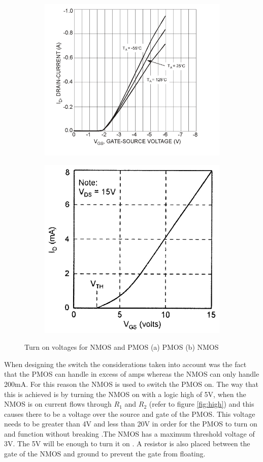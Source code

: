 \begin{figure}[!htb]
 \footnotesize
 \centering
    \begin{subfigure}[]{0.55\textwidth}
              \centering
  		\includegraphics[width=0.5\linewidth]{./Figures/PMOS.png}
		    \caption{} \label{subfig:PMOS-graph}
     \end{subfigure}
     \begin{subfigure}[]{0.4\textwidth}
             \centering
  		\includegraphics[width=0.6\linewidth]{./Figures/NMOS.jpg}
		   \caption{ } \label{subfig:NMOS-graph}
     \end{subfigure}
   \caption[{$V_{GS}$  vs  $I_{D}$}]{Turn on voltages for NMOS and PMOS (a)  PMOS \cite{PMOS}(b)  NMOS\cite{NMOS}  }
    \label{fig:simulation_results_box}
 \end{figure}




 When designing the switch the considerations taken into account was the fact that the PMOS can handle in excess of amps \cite{PMOS} whereas the NMOS can only handle 200mA\cite{NData}. For this reason the NMOS is used to switch the PMOS on. The way that this is achieved is by turning the NMOS on with a logic high of 5V, when the NMOS is on current flows through $R_1$ and $R_2$ (refer to figure \ref{fig:high}) and this causes there to be a voltage over the source and gate of the PMOS. This voltage needs to be greater than 4V and less than 20V in order for the PMOS to turn on and function without breaking \cite{PMOS}.The NMOS has a maximum threshold voltage of 3V. The 5V will be enough to turn it on \cite{NMOS}. A resistor is also placed between the gate of the NMOS and ground to prevent the gate from floating. 
 
